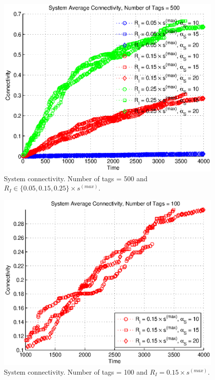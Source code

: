 \begin{figure}
\centering
\includegraphics[width=5in]{Chapter_4_Figures/sys_connect_500tags_all.eps}
\caption{System connectivity. Number of tags = 500 and $R_I \in \{0.05, 0.15, 0.25\} \times s^{(max)}$.}
\label{Figure: sys_connect_500tags_all.eps}
\end{figure}
\begin{figure}
\centering
\includegraphics[width=5in]{Chapter_4_Figures/sys_connect_100tags_15diam.eps}
\caption{System connectivity. Number of tags = 100 and $R_I = 0.15 \times s^{(max)}$.}
\label{Figure: sys_connect_100tags_15diam.eps}
\end{figure}
\clearpage


